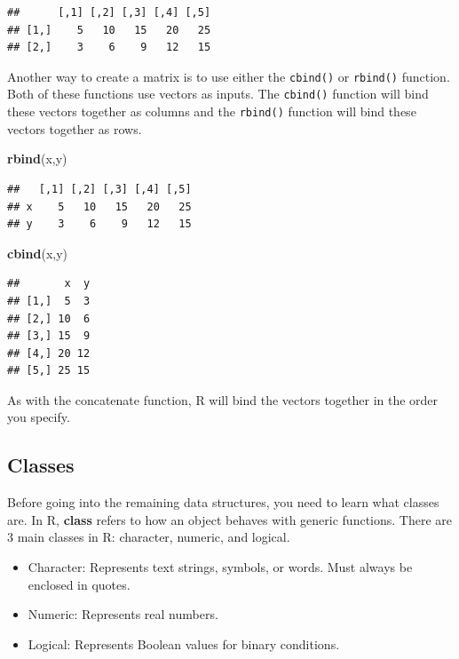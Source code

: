 \documentclass[
]{book}
\newenvironment{Shaded}{\begin{snugshade}}{\end{snugshade}}
\newcommand{\FunctionTok}[1]{\textcolor[rgb]{0.13,0.29,0.53}{\textbf{#1}}}
\newcommand{\NormalTok}[1]{#1}
\providecommand{\tightlist}{%
  \setlength{\itemsep}{0pt}\setlength{\parskip}{0pt}}
\theoremstyle{definition}
\theoremstyle{definition}
\theoremstyle{definition}
\theoremstyle{definition}
\theoremstyle{remark}
\begin{document}
\begin{verbatim}
##      [,1] [,2] [,3] [,4] [,5]
## [1,]    5   10   15   20   25
## [2,]    3    6    9   12   15
\end{verbatim}

Another way to create a matrix is to use either the \texttt{cbind()} or \texttt{rbind()} function. Both of these functions use vectors as inputs. The \texttt{cbind()} function will bind these vectors together as columns and the \texttt{rbind()} function will bind these vectors together as rows.

\begin{Shaded}
\begin{Highlighting}[]
\FunctionTok{rbind}\NormalTok{(x,y)}
\end{Highlighting}
\end{Shaded}

\begin{verbatim}
##   [,1] [,2] [,3] [,4] [,5]
## x    5   10   15   20   25
## y    3    6    9   12   15
\end{verbatim}

\begin{Shaded}
\begin{Highlighting}[]
\FunctionTok{cbind}\NormalTok{(x,y)}
\end{Highlighting}
\end{Shaded}

\begin{verbatim}
##       x  y
## [1,]  5  3
## [2,] 10  6
## [3,] 15  9
## [4,] 20 12
## [5,] 25 15
\end{verbatim}

As with the concatenate function, R will bind the vectors together in the order you specify.

\hypertarget{classes}{%
\subsection{Classes}\label{classes}}

Before going into the remaining data structures, you need to learn what classes are. In R, \textbf{class} refers to how an object behaves with generic functions. There are 3 main classes in R: character, numeric, and logical.

\begin{itemize}
\tightlist
\item
  Character: Represents text strings, symbols, or words. Must always be enclosed in quotes.
\item
  Numeric: Represents real numbers.
\item
  Logical: Represents Boolean values for binary conditions.
\end{itemize}
\end{document}
